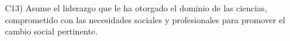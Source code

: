 C13) Asume el liderazgo que le ha otorgado el dominio de las ciencias,
comprometido con las necesidades sociales y profesionales para
promover el cambio social pertinente.
